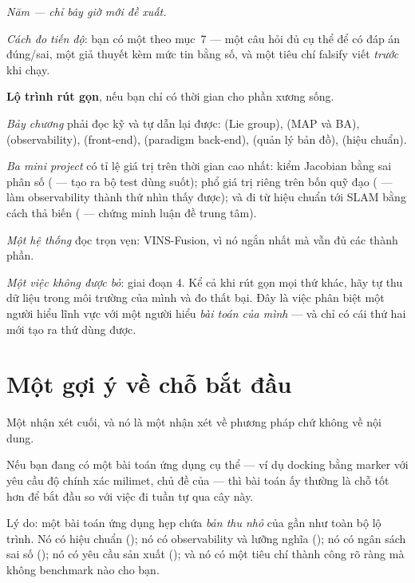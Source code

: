 \documentclass[../../vslam.tex]{subfiles}
\begin{document}
\emph{Năm --- chỉ bây giờ mới đề xuất.}

\emph{Cách đo tiến độ}: bạn có một  theo  mục~7 --- một câu hỏi đủ cụ thể để có đáp án đúng/sai, một giả thuyết kèm mức tin bằng số, và một tiêu chí falsify viết \emph{trước} khi chạy.

\begin{cannho}
\textbf{Lộ trình rút gọn}, nếu bạn chỉ có thời gian cho phần xương sống.

\emph{Bảy chương} phải đọc kỹ và tự dẫn lại được:  (Lie group),  (MAP và BA),  (observability),  (front-end),  (paradigm back-end),  (quản lý bản đồ),  (hiệu chuẩn).

\emph{Ba mini project} có tỉ lệ giá trị trên thời gian cao nhất: kiểm Jacobian bằng sai phân số ( --- tạo ra bộ test dùng suốt); phổ giá trị riêng trên bốn quỹ đạo ( --- làm observability thành thứ nhìn thấy được); và đi từ hiệu chuẩn tới SLAM bằng cách thả biến ( --- chứng minh luận đề trung tâm).

\emph{Một hệ thống} đọc trọn vẹn: VINS-Fusion, vì nó ngắn nhất mà vẫn đủ các thành phần.

\emph{Một việc không được bỏ}: giai đoạn 4. Kể cả khi rút gọn mọi thứ khác, hãy tự thu dữ liệu trong môi trường của mình và đo thất bại. Đây là việc phân biệt một người hiểu lĩnh vực với một người hiểu \emph{bài toán của mình} --- và chỉ có cái thứ hai mới tạo ra thứ dùng được.
\end{cannho}

\section{Một gợi ý về chỗ bắt đầu}

Một nhận xét cuối, và nó là một nhận xét về phương pháp chứ không về nội dung.

Nếu bạn đang có một bài toán ứng dụng cụ thể --- ví dụ docking bằng marker với yêu cầu độ chính xác milimet, chủ đề của  --- thì bài toán ấy thường là chỗ tốt hơn để bắt đầu so với việc đi tuần tự qua cây này.

Lý do: một bài toán ứng dụng hẹp chứa \emph{bản thu nhỏ} của gần như toàn bộ lộ trình. Nó có hiệu chuẩn (); nó có observability và lưỡng nghĩa (); nó có ngân sách sai số (); nó có yêu cầu sản xuất (); và nó có một tiêu chí thành công rõ ràng mà không benchmark nào cho bạn.
\end{document}
